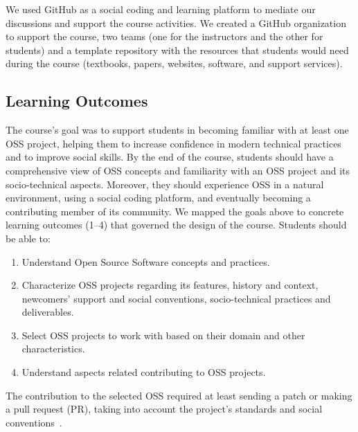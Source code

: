 \documentclass[sigconf]{acmart}
\begin{document}
We used GitHub as a social coding and learning platform to mediate our discussions and support the course activities.
%
We created a GitHub organization to support the course, two teams 
(one for the instructors and the other for students) and a template repository with the resources that students would need during the course (textbooks, papers, websites, software, and support services). 

\subsection{Learning Outcomes} \label{sec:learning_outcomes}

The course's goal was to support students in becoming familiar with at least one OSS project, helping them to increase confidence in modern technical practices and to improve social skills.  
By the end of the course, students should have a comprehensive view of OSS concepts and familiarity with an OSS project and its socio-technical aspects. Moreover, they should experience OSS in a natural environment, using a social coding platform, and eventually becoming a contributing member of its community. 
%
We mapped the goals above to concrete learning outcomes (1--4) that governed the design of the course. 
Students should be able to:
\begin{enumerate}[label=\textbf{LO\arabic*}]
\item Understand Open Source Software concepts and practices.
\item Characterize OSS projects regarding its features, history and context, newcomers' support and social conventions, socio-technical practices and deliverables.
\item Select OSS projects to work with based on their domain and other characteristics.
\item Understand aspects related contributing to OSS projects.
\end{enumerate}

The contribution to the selected OSS required at least sending a patch or 
making a pull request (PR), taking into account the project's standards and social conventions~\cite{ryan:icse:seet:2022}.
\end{document}
